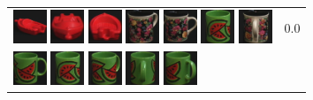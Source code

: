 \begin{figure}[tbp]
\begin{center}
\begin{tabular}{m{11cm} | m{3cm} |}
\includegraphics[width=1cm]{coil/beeld-22.eps}
\includegraphics[width=1cm]{coil/beeld-20.eps}
\includegraphics[width=1cm]{coil/beeld-23.eps}
\includegraphics[width=1cm]{coil/beeld-63.eps}
\includegraphics[width=1cm]{coil/beeld-60.eps}
\includegraphics[width=1cm]{coil/beeld-32.eps}
\includegraphics[width=1cm]{coil/beeld-65.eps}
& {\scriptsize 0.0}
\\
\includegraphics[width=1cm]{coil/beeld-30.eps}
\includegraphics[width=1cm]{coil/beeld-32.eps}
\includegraphics[width=1cm]{coil/beeld-33.eps}
\includegraphics[width=1cm]{coil/beeld-35.eps}
\includegraphics[width=1cm]{coil/beeld-34.eps}

\end{tabular}
\end{center}
\end{figure}
